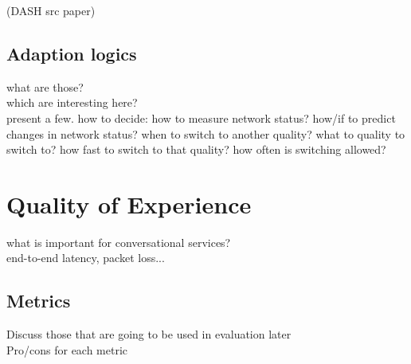 \cite{Soda11} (DASH src paper)

\subsection{Adaption logics}
what are those? \\
which are interesting here? \\
present a few. 
how to decide:
	how to measure network status?
	how/if to predict changes in network status?
	when to switch to another quality?
	what to quality to switch to?
	how fast to switch to that quality?
	how often is switching allowed?
	

\section{Quality of Experience}
what is important for conversational services? \\
end-to-end latency, packet loss...

\subsection{Metrics}
Discuss those that are going to be used in evaluation later \\
Pro/cons for each metric


